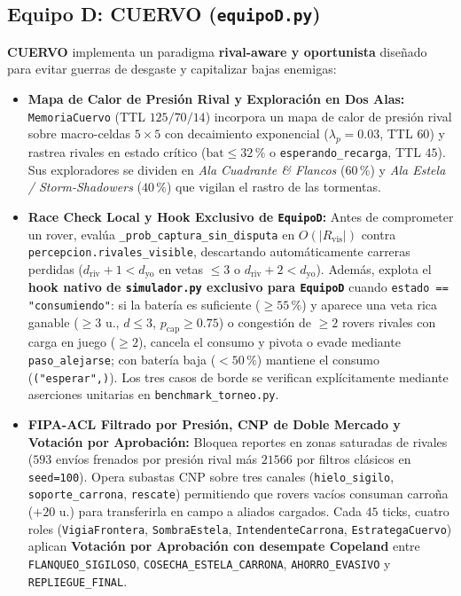 \documentclass[10pt,a4paper]{article}
\begin{document}
\subsection{Equipo D: CUERVO (\texttt{equipoD.py})}
\textbf{CUERVO} implementa un paradigma \textbf{rival-aware y oportunista} diseñado para evitar guerras de desgaste y capitalizar bajas enemigas:
\begin{itemize}
  \item \textbf{Mapa de Calor de Presión Rival y Exploración en Dos Alas:} \texttt{MemoriaCuervo} (TTL $125/70/14$) incorpora un mapa de calor de presión rival sobre macro-celdas $5\times 5$ con decaimiento exponencial ($\lambda_p = 0.03$, TTL $60$) y rastrea rivales en estado crítico ($\text{bat} \le 32\,\%$ o \texttt{esperando\_recarga}, TTL $45$). Sus exploradores se dividen en \emph{Ala Cuadrante \& Flancos} ($60\,\%$) y \emph{Ala Estela / Storm-Shadowers} ($40\,\%$) que vigilan el rastro de las tormentas.
  \item \textbf{Race Check Local y Hook Exclusivo de \texttt{EquipoD}:} Antes de comprometer un rover, evalúa \texttt{\_prob\_captura\_sin\_disputa} en $O(|R_{\text{vis}}|)$ contra \texttt{percepcion.rivales\_visible}, descartando automáticamente carreras perdidas ($d_{\text{riv}} + 1 < d_{\text{yo}}$ en vetas $\le 3$ o $d_{\text{riv}} + 2 < d_{\text{yo}}$). Además, explota el \textbf{hook nativo de \texttt{simulador.py} exclusivo para \texttt{EquipoD}} cuando \texttt{estado == "consumiendo"}: si la batería es suficiente ($\ge 55\,\%$) y aparece una veta rica ganable ($\ge 3\text{ u.}$, $d\le 3$, $p_{\text{cap}}\ge 0.75$) o congestión de $\ge 2$ rovers rivales con carga en juego ($\ge 2$), cancela el consumo y pivota o evade mediante \texttt{paso\_alejarse}; con batería baja ($<50\,\%$) mantiene el consumo (\texttt{("esperar",)}). Los tres casos de borde se verifican explícitamente mediante aserciones unitarias en \texttt{benchmark\_torneo.py}.
  \item \textbf{FIPA-ACL Filtrado por Presión, CNP de Doble Mercado y Votación por Aprobación:} Bloquea reportes en zonas saturadas de rivales ($593$ envíos frenados por presión rival más $21566$ por filtros clásicos en \texttt{seed=100}). Opera subastas CNP sobre tres canales (\texttt{hielo\_sigilo}, \texttt{soporte\_carrona}, \texttt{rescate}) permitiendo que rovers vacíos consuman carroña ($+20\text{ u.}$) para transferirla en campo a aliados cargados. Cada $45$ ticks, cuatro roles (\texttt{VigiaFrontera}, \texttt{SombraEstela}, \texttt{IntendenteCarrona}, \texttt{EstrategaCuervo}) aplican \textbf{Votación por Aprobación con desempate Copeland} entre \texttt{FLANQUEO\_SIGILOSO}, \texttt{COSECHA\_ESTELA\_CARRONA}, \texttt{AHORRO\_EVASIVO} y \texttt{REPLIEGUE\_FINAL}.
\end{itemize}
\end{document}
